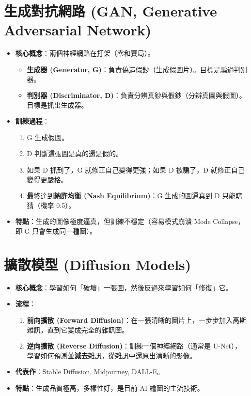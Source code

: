 \documentclass[
  letterpaper,
  DIV=11,
  numbers=noendperiod]{scrreprt}
\providecommand{\tightlist}{%
  \setlength{\itemsep}{0pt}\setlength{\parskip}{0pt}}
\begin{document}
\section{生成對抗網路 (GAN, Generative Adversarial
Network)}\label{sec-gan}

\begin{itemize}
\tightlist
\item
  \textbf{核心概念}：兩個神經網路在打架（零和賽局）。

  \begin{itemize}
  \tightlist
  \item
    \textbf{生成器 (Generator,
    G)}：負責偽造假鈔（生成假圖片）。目標是騙過判別器。
  \item
    \textbf{判別器 (Discriminator,
    D)}：負責分辨真鈔與假鈔（分辨真圖與假圖）。目標是抓出生成器。
  \end{itemize}
\item
  \textbf{訓練過程}：

  \begin{enumerate}
  \def\labelenumi{\arabic{enumi}.}
  \tightlist
  \item
    G 生成假圖。
  \item
    D 判斷這張圖是真的還是假的。
  \item
    如果 D 抓到了，G 就修正自己變得更強；如果 D 被騙了，D
    就修正自己變得更嚴格。
  \item
    最終達到\textbf{納許均衡 (Nash Equilibrium)}：G 生成的圖逼真到 D
    只能瞎猜（機率 0.5）。
  \end{enumerate}
\item
  \textbf{特點}：生成的圖像極度逼真，但訓練不穩定（容易模式崩潰 Mode
  Collapse，即 G 只會生成同一種圖）。
\end{itemize}

\section{擴散模型 (Diffusion Models)}\label{sec-diffusion}

\begin{itemize}
\tightlist
\item
  \textbf{核心概念}：學習如何「破壞」一張圖，然後反過來學習如何「修復」它。
\item
  \textbf{流程}：

  \begin{enumerate}
  \def\labelenumi{\arabic{enumi}.}
  \tightlist
  \item
    \textbf{前向擴散 (Forward
    Diffusion)}：在一張清晰的圖片上，一步步加入高斯雜訊，直到它變成完全的雜訊圖。
  \item
    \textbf{逆向擴散 (Reverse Diffusion)}：訓練一個神經網路（通常是
    U-Net），學習如何預測並\textbf{減去}雜訊，從雜訊中還原出清晰的影像。
  \end{enumerate}
\item
  \textbf{代表作}：Stable Diffusion, Midjourney, DALL-E。
\item
  \textbf{特點}：生成品質極高，多樣性好，是目前 AI 繪圖的主流技術。
\end{itemize}
\end{document}
